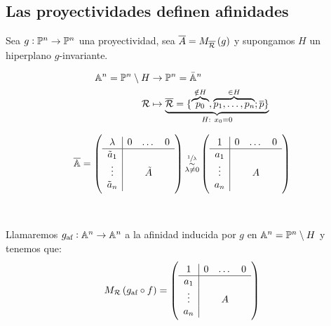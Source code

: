 \subsection{Las proyectividades definen afinidades}
Sea $g: \mathbb{P}^n \to \mathbb{P}^n$ una proyectividad, sea $\overline{A}=M_{\overline{\mathcal{R}}}\left( g\right)$ y supongamos $H$ un hiperplano $g$-invariante. \\
    \begin{minipage}[c]{0,44\textwidth}
        \begin{align*}
            \mathbb{A}^n = \mathbb{P}^n\setminus H &\to  \mathbb{P}^n = \bar{\mathbb{A}}^n \\
            \mathcal{R} &\mapsto  \underbrace{\overline{\mathcal{R}}= \{\overbrace{p_0}^{\notin H}, \overbrace{p_1,\dots, p_n}^{\in H};\overline{p}\}}_{H\text{: }x_0=0}
        \end{align*}
    \end{minipage}
    \vline
    \begin{minipage}[c]{0,56\textwidth}
        \begin{gather*}
            \overline{\mathbb{A}}=\left(
                \begin{array}{c|ccc}
                    \lambda & 0 & \dots & 0 \\ \hline
                    \tilde{a}_1 & & & \\
                    \vdots & & \tilde{A} & \\
                    \tilde{a}_n & & & 
                \end{array} \right) 
                \substack{\sfrac{1}{\lambda} \\ \sim \\ \lambda\neq0}
            \left(
                \begin{array}{c|ccc}
                    1 & 0 & \dots & 0 \\ \hline
                    a_1 & & & \\
                    \vdots & & A & \\
                    a_n & & & 
                \end{array} \right)
        \end{gather*}
    \end{minipage}\\
    \begin{defi}
        Llamaremos $g_\text{af} : \mathbb{A}^n \to \mathbb{A}^n$ a la afinidad inducida por $g$ en $\mathbb{A}^n = \mathbb{P}^n\setminus H$ y tenemos que:
        \begin{gather*}
            M_{\mathcal{R}} \left( g_\text{af} \circ f\right) =
            \left(
                \begin{array}{c|ccc}
                    1 & 0 & \dots & 0 \\ \hline
                    a_1 & & & \\
                    \vdots & & A & \\
                    a_n & & & 
                \end{array} \right)
        \end{gather*}
    \end{defi}
